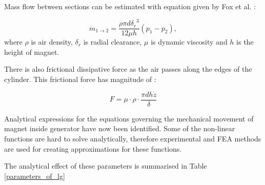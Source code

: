 Mass flow between sections can be estimated with equation given by Fox et al. \cite{Fox2008}:

\begin{equation}
  \dot{m}_{1 \rightarrow 2} = \frac{\rho \pi d {\delta_r}^3}{12\mu h}(p_1-p_2),
\end{equation}
where $\rho$ is air density, $\delta_r$ is radial clearance, $\mu$ is dynamic viscosity and $h$ is the height of magnet. \cite{Tornincasa2012}

There is also frictional dissipative force as the air passes along the edges of the cylinder. This frictional force has magnitude of \cite{Medhat2008}: 

\begin{equation}
  F = \mu \cdot \rho \cdot \frac{\pi d h \dot{z}}{\delta}  
\end{equation}

Analytical expressions for the equations governing the mechanical movement of magnet inside generator have now been identified. Some of the non-linear functions are hard to solve analytically, therefore experimental and FEA methods are used for creating approximations for these functions.

The analytical effect of these parameters is summarised in Table \ref{parameters_of_lg}

\begin{table}[htb]
\caption{\label{parameters_of_lg} Effect of the parameters of the generator}
\begin{center}
\end{center}
\end{table}

